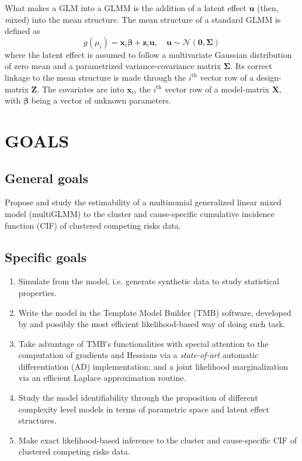 What makes a GLM into a GLMM \cite{GLMM} is the addition of a latent
effect \(\bm{u}\) (then, \textit{m}ixed) into the mean structure. The
mean structure of a standard GLMM is defined as
\[
  g(\mu_{i}) = \bm{x}_{i}\bm{\beta} + \bm{z}_{i}\bm{u},
  \quad \bm{u} \sim \mathcal{N}(\bm{0},\bm{\Sigma})
\]
where the latent effect is assumed to follow a multivariate Gaussian
distribution of zero mean and a parametrized variance-covariance matrix
\(\bm{\Sigma}\). Its correct linkage to the mean structure is made
through the \(i^\text{th}\) vector row of a design-matrix \(\bm{Z}\).
The covariates are into \(\bm{x}_{i}\), the \(i^\text{th}\) vector row
of a model-matrix \(\bm{X}\), with \(\bm{\beta}\) being a vector of
unknown parameters.

\section{GOALS}

\subsection{General goals}

Propose and study the estimability of a multinomial generalized linear
mixed model (multiGLMM) to the cluster and cause-specific cumulative
incidence function (CIF) of clustered competing risks data.

\subsection{Specific goals}

\begin{enumerate}
 \item Simulate from the model, i.e. generate synthetic data to study
       statistical properties.

 \item Write the model in the Template Model Builder (TMB) software,
       developed by  and possibly the most efficient
       likelihood-based way of doing such task.

 \item Take advantage of TMB's functionalities with special attention to
       the computation of gradients and Hessians via a
       \textit{state-of-art} automatic differentiation (AD)
       implementation; and a joint likelihood marginalization via an
       efficient Laplace approximation routine.

 \item Study the model identifiability through the proposition of
       different complexity level models in terms of parametric space
       and latent effect structures.

 \item Make exact likelihood-based inference to the cluster and
       cause-specific CIF of clustered competing risks data.
\end{enumerate}

